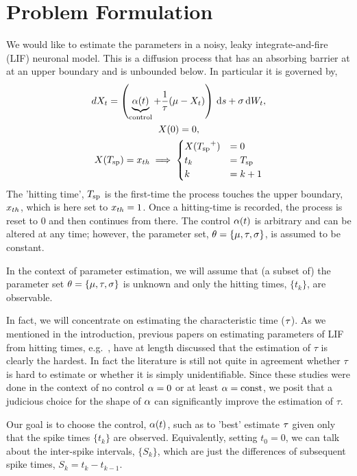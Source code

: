  
\section{Problem Formulation}
\label{sec:problem_formulation}
We would like to estimate the parameters in a noisy, leaky integrate-and-fire
(LIF) neuronal model. This is a diffusion process that has an absorbing barrier
at at an upper boundary and is unbounded below. In particular it is governed by,
\begin{equation}
\begin{gathered}
dX_t = \left(\underbrace{\a(t)}_{\textrm{control}} + \frac 1\tc(\m %
 - {X_t} ) \right) \intd{s} + \s\intd{W_t},
\\
X(0) = 0,
\\
X(\ts) = \xth \implies  
\begin{cases}
X(\ts^+) &= 0   
\\
t_k &=  \ts
\\
k  &= k+1
\end{cases}
\end{gathered} 
\label{eq:X_evolution_uo_control}
\end{equation}
The 'hitting time', ${ T_{\textrm{sp} } }$ is the first-time the process touches the upper
boundary, ${ x_{th} }$, which is here set to ${ x_{th} }=1$. Once a hitting-time is
recorded, the process is reset to $0$ and then continues from there. The control
$\alpha(t)$ is arbitrary and can be altered at any time; however, the parameter set,
${ \theta} = \{{\mu }, { \tau }, \sigma\}$, is assumed to be constant.

In the context of parameter estimation, we will assume that (a subset of) the
parameter set ${ \theta} = \{{\mu }, { \tau }, \sigma\}$ is unknown and only the hitting times,
$\{t_k\}$, are observable.

In fact, we will concentrate on estimating the characteristic time (${ \tau }$). As
we mentioned in the introduction, previous papers on estimating parameters of
LIF from hitting times, e.g.\ \cite{Ditlevsen2007,MullowneyIyengar2008}, have
at length discussed that the estimation of $\tau$ is clearly the
hardest. In fact the literature is still not quite in agreement whether $\tau$ is hard to estimate or
whether it is simply unidentifiable. Since these studies were done in the
context of no control $\alpha=0$ or at least $\alpha= \textrm{const}$, we posit that
a judicious choice for the shape of $\alpha$ can significantly improve the
estimation of $\tau$.

Our goal is to choose the control, $\alpha(t)$, such as to 'best' estimate ${ \tau }$
given only that the spike times $\{t_k\}$ are observed. Equivalently, setting
$t_0 = 0$, we can talk about the inter-spike intervals, $\{S_k\}$, which are
just the differences of subsequent spike times, $S_k = t_k - t_{k-1}$.

